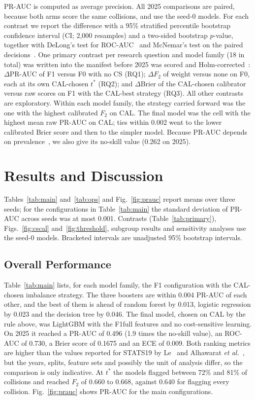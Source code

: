 \documentclass[conference,letterpaper]{IEEEtran}
\begin{document}
PR-AUC is computed as average precision. All 2025 comparisons are paired, because both arms score the same collisions, and use the seed-0 models. For each contrast we report the difference with a 95\% stratified percentile bootstrap confidence interval (CI; 2,000 resamples) and a two-sided bootstrap $p$-value, together with DeLong's test for ROC-AUC~\cite{delong1988comparing} and McNemar's test on the paired decisions~\cite{mcnemar1947note}. One primary contrast per research question and model family (18 in total) was written into the manifest before 2025 was scored and Holm-corrected~\cite{holm1979simple}: $\Delta$PR-AUC of F1 versus F0 with no CS (RQ1); $\Delta F_2$ of weight versus none on F0, each at its own CAL-chosen $t^{*}$ (RQ2); and $\Delta$Brier of the CAL-chosen calibrator versus raw scores on F1 with the CAL-best strategy (RQ3). All other contrasts are exploratory. Within each model family, the strategy carried forward was the one with the highest calibrated $F_2$ on CAL. The final model was the cell with the highest mean raw PR-AUC on CAL; ties within 0.002 went to the lower calibrated Brier score and then to the simpler model. Because PR-AUC depends on prevalence~\cite{saito2015precision}, we also give its no-skill value (0.262 on 2025).

\section{Results and Discussion}

Tables~\ref{tab:main} and~\ref{tab:ops} and Fig.~\ref{fig:prauc} report means over three seeds; for the configurations in Table~\ref{tab:main} the standard deviation of PR-AUC across seeds was at most 0.001. Contrasts (Table~\ref{tab:primary}), Figs.~\ref{fig:cscal} and~\ref{fig:threshold}, subgroup results and sensitivity analyses use the seed-0 models. Bracketed intervals are unadjusted 95\% bootstrap intervals.

\subsection{Overall Performance}

Table~\ref{tab:main} lists, for each model family, the F1 configuration with the CAL-chosen imbalance strategy. The three boosters are within 0.004 PR-AUC of each other, and the best of them is ahead of random forest by 0.013, logistic regression by 0.023 and the decision tree by 0.046. The final model, chosen on CAL by the rule above, was LightGBM with the F1full features and no cost-sensitive learning. On 2025 it reached a PR-AUC of 0.496 (1.9 times the no-skill value), an ROC-AUC of 0.730, a Brier score of 0.1675 and an ECE of 0.009. Both ranking metrics are higher than the values reported for STATS19 by Le~\cite{le2026ksi} and Alhawarat \textit{et al.}~\cite{alhawarat2026calibrated}, but the years, splits, feature sets and possibly the unit of analysis differ, so the comparison is only indicative. At $t^{*}$ the models flagged between 72\% and 81\% of collisions and reached $F_2$ of 0.660 to 0.668, against 0.640 for flagging every collision. Fig.~\ref{fig:prauc} shows PR-AUC for the main configurations.
\end{document}
